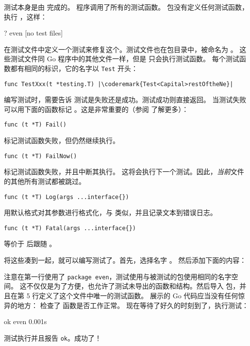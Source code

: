 
测试本身是由  完成的。
 程序调用了所有的测试函数。
 包没有定义任何测试函数，执行 ，这样：
\begin{display}
\pr {}
?       even    [no test files]
\end{display}
在测试文件中定义一个测试来修复这个。测试文件也在包目录中，被命名为 。
这些测试文件同 Go 程序中的其他文件一样，但是  只会执行测试函数。
每个测试函数都有相同的标识，它的名字以 \lstinline{Test} 开头：
\begin{lstlisting}
func TestXxx(t *testing.T) |\coderemark{Test<Capital>restOftheNe}|
\end{lstlisting}

编写测试时，需要告诉  测试是失败还是成功。测试成功则直接返回。
当测试失败可以用下面的函数标记 \cite{go_doc}。这是非常重要的（参阅  了解更多）：

\begin{lstlisting}[numbers=none]
func (t *T) Fail()
\end{lstlisting}
 标记测试函数失败，但仍然继续执行。

\begin{lstlisting}[numbers=none]
func (t *T) FailNow()
\end{lstlisting}
 标记测试函数失败，并且中断其执行。
这将会执行下一个测试。因此，\emph{当前}文件的其他所有测试都被跳过。

\begin{lstlisting}[numbers=none]
func (t *T) Log(args ...interface{})
\end{lstlisting}
 用默认格式对其参数进行格式化，与
 类似，并且记录文本到错误日志。

\begin{lstlisting}[numbers=none]
func (t *T) Fatal(args ...interface{})
\end{lstlisting}
 等价于  后跟随 。

将这些凑到一起，就可以编写测试了。首先，选择名字 。
然后添加下面的内容：


注意在第一行使用了 \lstinline{package even}，测试使用与被测试的包使用相同的名字空间。
这不仅仅是为了方便，也允许了测试未导出的函数和结构。然后导入
 包，并且在第 5 行定义了这个文件中唯一的测试函数。
展示的 Go 代码应当没有任何惊异的地方：
检查了  函数是否工作正常。
现在等待了好久的时刻到了，执行测试：
\begin{display}
\pr {}
ok      even    0.001s
\end{display}
\noindent{}测试执行并且报告 \texttt{ok}。成功了！

